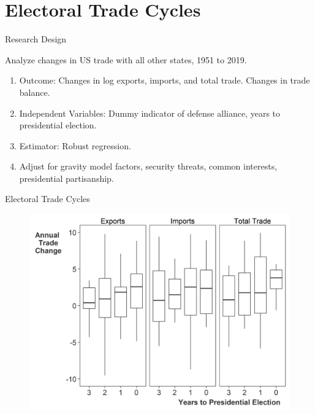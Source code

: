\documentclass[12pt]{beamer}
\begin{document}


\section{Electoral Trade Cycles} 


\begin{frame}{Research Design}

\pause
Analyze changes in US trade with all other states, 1951 to 2019. 
\pause
\begin{enumerate}
\item Outcome: Changes in log exports, imports, and total trade. Changes in trade balance.  
\pause
\item Independent Variables: Dummy indicator of defense alliance, years to presidential election.
\pause 
\item Estimator: Robust regression. 
\pause 
\item Adjust for gravity model factors, security threats, common interests, presidential partisanship.
\end{enumerate} 

\end{frame} 


\begin{frame}{Electoral Trade Cycles}

\begin{figure}[htbp]
	\centering
		\includegraphics[height=.9\textheight]{us-trade-cycles.png}
\end{figure}


\end{frame} 
\end{document}
